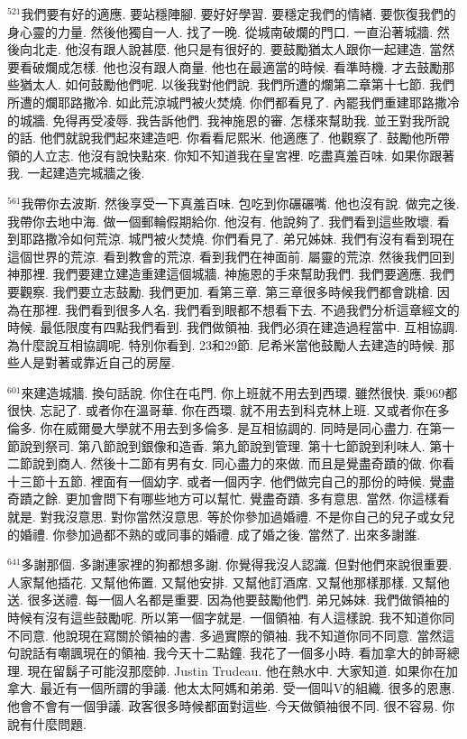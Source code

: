 \documentclass{book}
\begin{document}
$^{521}$我們要有好的適應.
要站穩陣腳.
要好好學習.
要穩定我們的情緒.
要恢復我們的身心靈的力量.
然後他獨自一人.
找了一晚.
從城南破爛的門口.
一直沿著城牆.
然後向北走.
他沒有跟人說甚麼.
他只是有很好的.
要鼓勵猶太人跟你一起建造.
當然要看破爛成怎樣.
他也沒有跟人商量.
他也在最適當的時候.
看準時機.
才去鼓勵那些猶太人.
如何鼓勵他們呢.
以後我對他們說.
我們所遭的爛第二章第十七節.
我們所遭的爛耶路撒冷.
如此荒涼城門被火焚燒.
你們都看見了.
內罷我們重建耶路撒冷的城牆.
免得再受凌辱.
我告訴他們.
我神施恩的審.
怎樣來幫助我.
並王對我所說的話.
他們就說我們起來建造吧.
你看看尼熙米.
他適應了.
他觀察了.
鼓勵他所帶領的人立志.
他沒有說快點來.
你知不知道我在皇宮裡.
吃盡真羞百味.
如果你跟著我.
一起建造完城牆之後.

$^{561}$我帶你去波斯.
然後享受一下真羞百味.
包吃到你碾碾嘴.
他也沒有說.
做完之後.
我帶你去地中海.
做一個郵輪假期給你.
他沒有.
他說夠了.
我們看到這些敗壞.
看到耶路撒冷如何荒涼.
城門被火焚燒.
你們看見了.
弟兄姊妹.
我們有沒有看到現在這個世界的荒涼.
看到教會的荒涼.
看到我們在神面前.
屬靈的荒涼.
然後我們回到神那裡.
我們要建立建造重建這個城牆.
神施恩的手來幫助我們.
我們要適應.
我們要觀察.
我們要立志鼓勵.
我們更加.
看第三章.
第三章很多時候我們都會跳槍.
因為在那裡.
我們看到很多人名.
我們看到眼都不想看下去.
不過我們分析這章經文的時候.
最低限度有四點我們看到.
我們做領袖.
我們必須在建造過程當中.
互相協調.
為什麼說互相協調呢.
特別你看到.
23和29節.
尼希米當他鼓勵人去建造的時候.
那些人是對著或靠近自己的房屋.

$^{601}$來建造城牆.
換句話說.
你住在屯門.
你上班就不用去到西環.
雖然很快.
乘969都很快.
忘記了.
或者你在溫哥華.
你在西環.
就不用去到科克林上班.
又或者你在多倫多.
你在威爾曼大學就不用去到多倫多.
是互相協調的.
同時是同心盡力.
在第一節說到祭司.
第八節說到銀像和造香.
第九節說到管理.
第十七節說到利味人.
第十二節說到商人.
然後十二節有男有女.
同心盡力的來做.
而且是覺盡奇蹟的做.
你看十三節十五節.
裡面有一個幼字.
或者一個丙字.
他們做完自己的那份的時候.
覺盡奇蹟之餘.
更加會問下有哪些地方可以幫忙.
覺盡奇蹟.
多有意思.
當然.
你這樣看就是.
對我沒意思.
對你當然沒意思.
等於你參加過婚禮.
不是你自己的兒子或女兒的婚禮.
你參加過都不熟的或同事的婚禮.
成了婚之後.
當然了.
出來多謝誰.

$^{641}$多謝那個.
多謝連家裡的狗都想多謝.
你覺得我沒人認識.
但對他們來說很重要.
人家幫他插花.
又幫他佈置.
又幫他安排.
又幫他訂酒席.
又幫他那樣那樣.
又幫他送.
很多送禮.
每一個人名都是重要.
因為他要鼓勵他們.
弟兄姊妹.
我們做領袖的時候有沒有這些鼓勵呢.
所以第一個字就是.
一個領袖.
有人這樣說.
我不知道你同不同意.
他說現在寫關於領袖的書.
多過實際的領袖.
我不知道你同不同意.
當然這句說話有嘲諷現在的領袖.
我今天十二點鐘.
我花了一個多小時.
看加拿大的帥哥總理.
現在留鬍子可能沒那麼帥.
Justin Trudeau.
他在熱水中.
大家知道.
如果你在加拿大.
最近有一個所謂的爭議.
他太太阿媽和弟弟.
受一個叫V的組織.
很多的恩惠.
他會不會有一個爭議.
政客很多時候都面對這些.
今天做領袖很不同.
很不容易.
你說有什麼問題.
\end{document}

